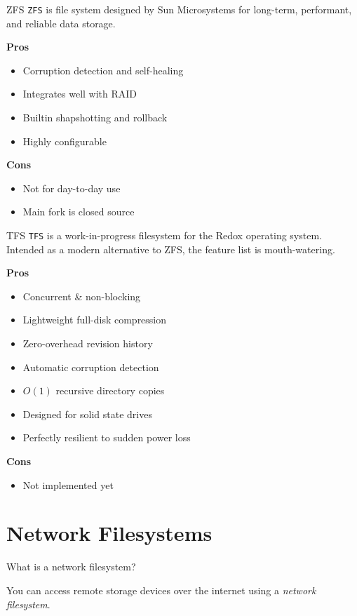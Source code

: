 \documentclass{lug}
\begin{document}

\begin{frame}{ZFS}
\texttt{ZFS} is file system designed by Sun Microsystems for long-term,
performant, and reliable data storage.

\textbf{Pros}\begin{itemize}
    \item Corruption detection and self-healing 
    \item Integrates well with RAID
    \item Builtin shapshotting and rollback
    \item Highly configurable
\end{itemize}

\textbf{Cons}\begin{itemize}
    \item Not for day-to-day use
    \item Main fork is closed source
\end{itemize}
\end{frame}

\begin{frame}{TFS}
\texttt{TFS} is a work-in-progress filesystem for the Redox operating system.
Intended as a modern alternative to ZFS, the feature list is mouth-watering.

\textbf{Pros}\begin{itemize}
    \item Concurrent \& non-blocking
    \item Lightweight full-disk compression
    \item Zero-overhead revision history
    \item Automatic corruption detection
    \item $O(1)$ recursive directory copies
    \item Designed for solid state drives
    \item Perfectly resilient to sudden power loss 
\end{itemize}

\textbf{Cons}\begin{itemize}
    \item Not implemented yet
\end{itemize}
\end{frame}

\section{Network Filesystems}
\begin{frame}{What is a network filesystem?}
\begin{center}
    You can access remote storage devices over the internet using a
    \emph{network filesystem}.
\end{center}
\end{frame}
\end{document}
